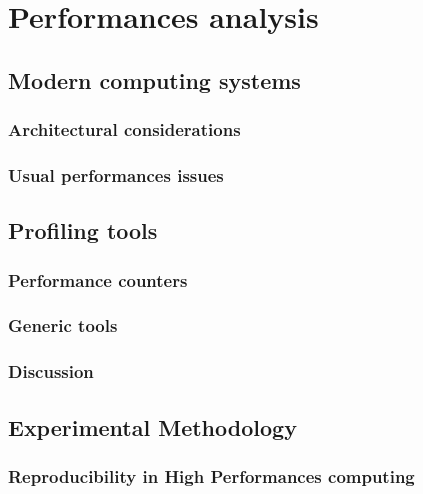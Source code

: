 \chapter{Performances analysis}

\section{Modern computing systems}

\subsection{Architectural considerations}


\subsection{Usual performances issues}



\section{Profiling tools}


\subsection{Performance counters}


\subsection{Generic tools}


\subsection{Discussion}

\section{Experimental Methodology}

\subsection{Reproducibility in High Performances computing}

